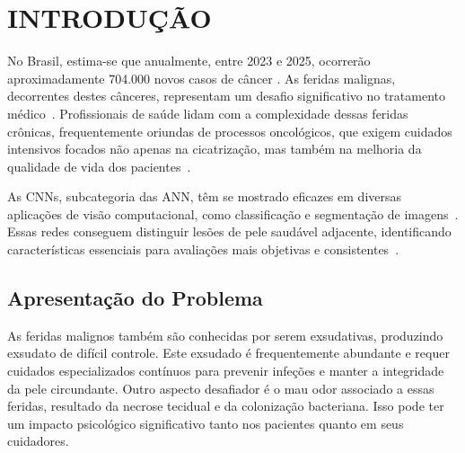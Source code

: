 \section{INTRODUÇÃO}
No Brasil, estima-se que anualmente, entre 2023 e 2025, ocorrerão aproximadamente 704.000 novos casos de câncer . As feridas malignas, decorrentes destes cânceres, representam um desafio significativo no tratamento médico~\cite{de2023estimativa}. Profissionais de saúde lidam com a complexidade dessas feridas crônicas, frequentemente oriundas de processos oncológicos, que exigem cuidados intensivos focados não apenas na cicatrização, mas também na melhoria da qualidade de vida dos pacientes~\cite{freitas2017intervenccoes, agra2017neoplastic}.

 As \acp{CNN}, subcategoria das \ac{ANN}, têm se mostrado eficazes em diversas aplicações de visão computacional, como classificação e segmentação de imagens~\cite{sun2023convolution}. Essas redes conseguem distinguir lesões de pele saudável adjacente, identificando características essenciais para avaliações mais objetivas e consistentes~\cite{litjens2017, lundervold2019, esteva2019}.

\subsection{Apresentação do Problema}

  

As feridas malignos também são conhecidas por serem exsudativas, produzindo exsudato de difícil controle. Este exsudado é frequentemente abundante e requer cuidados especializados contínuos para prevenir infeções e manter a integridade da pele circundante. Outro aspecto desafiador é o mau odor associado a essas feridas, resultado da necrose tecidual e da colonização bacteriana. Isso pode ter um impacto psicológico significativo tanto nos pacientes quanto em seus cuidadores. 

